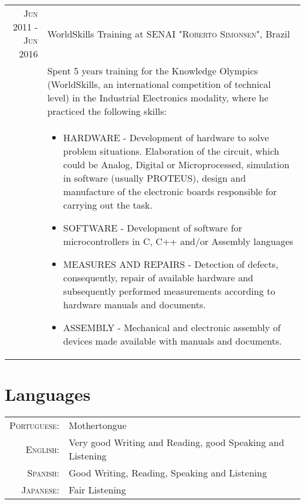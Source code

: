\documentclass[a4paper,10pt]{article} %
\begin{document}
\begin{tabular}{r|p{11cm}}
\textsc{Jun} 2011 - \textsc{Jun} 2016 &  WorldSkills Training at \textsc{SENAI "Roberto Simonsen"}, Brazil \\
& \footnotesize{Spent 5 years training for the Knowledge Olympics (WorldSkills, an international competition of technical level) in the Industrial Electronics modality, where he practiced the following skills:}\\
& \footnotesize{
\begin{itemize}
    \item HARDWARE - Development of hardware to solve problem situations. Elaboration of the circuit, which could be Analog, Digital or Microprocessed, simulation in software (usually PROTEUS), design and manufacture of the electronic boards responsible for carrying out the task.
    \item SOFTWARE - Development of software for microcontrollers in C, C++ and/or Assembly languages
    \item MEASURES AND REPAIRS - Detection of defects, consequently, repair of available hardware and subsequently performed measurements according to hardware manuals and documents.
    \item ASSEMBLY - Mechanical and electronic assembly of devices made available with manuals and documents.
\end{itemize}}\\


\end{tabular}



\section{Languages}

\begin{tabular}{rp{10cm}}

\textsc{Portuguese:} & Mothertongue\\

\textsc{English:} & Very good Writing and Reading, good Speaking and Listening\\

\textsc{Spanish:} & Good Writing, Reading, Speaking and Listening\\

\textsc{Japanese:} & Fair Listening\\
\end{tabular}
\end{document}
